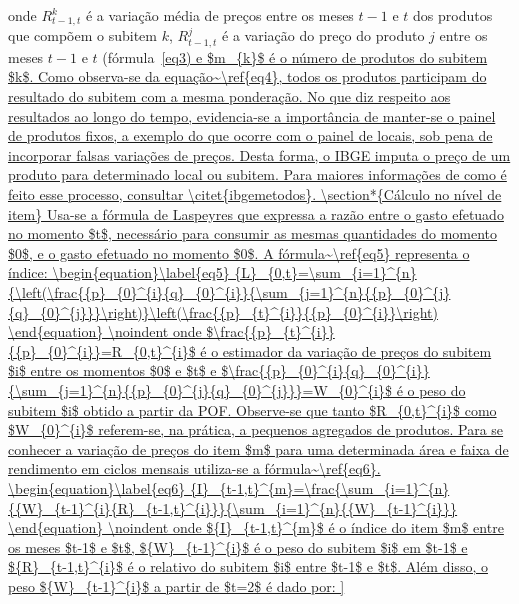 \documentclass[twoside,a4paper,11pt]{report}
\begin{document}
\noindent onde ${R}_{t-1,t}^{k}$ é a variação média de preços entre os meses $t-1$ e $t$ dos produtos que compõem o subitem $k$, ${R}_{t-1,t}^{j}$ é a variação do preço do produto $j$ entre os meses $t-1$ e $t$ (fórmula~\ref{eq3) e $m_{k}$ é o número de produtos do subitem $k$. Como observa-se da equação~\ref{eq4}, todos os produtos participam do resultado do subitem com a mesma ponderação.

No que diz respeito aos resultados ao longo do tempo, evidencia-se a importância de manter-se o painel de produtos fixos, a exemplo do que ocorre com o painel de locais, sob pena de incorporar falsas variações de preços. Desta forma, o IBGE imputa o preço de um produto para determinado local ou subitem. Para maiores informações de como é feito esse processo, consultar \citet{ibgemetodos}.

\section*{Cálculo no nível de item}

Usa-se a fórmula de Laspeyres que expressa a razão entre o gasto efetuado no momento $t$, necessário para consumir as mesmas quantidades do momento $0$, e o gasto efetuado no momento $0$. A fórmula~\ref{eq5} representa o índice:

\begin{equation}\label{eq5}
{L}_{0,t}=\sum_{i=1}^{n}{\left(\frac{{p}_{0}^{i}{q}_{0}^{i}}{\sum_{j=1}^{n}{{p}_{0}^{j}{q}_{0}^{j}}}\right)}\left(\frac{{p}_{t}^{i}}{{p}_{0}^{i}}\right) 
\end{equation}

\noindent onde $\frac{{p}_{t}^{i}}{{p}_{0}^{i}}=R_{0,t}^{i}$ é o estimador da variação de preços do subitem $i$ entre os momentos $0$ e $t$ e $\frac{{p}_{0}^{i}{q}_{0}^{i}}{\sum_{j=1}^{n}{{p}_{0}^{j}{q}_{0}^{j}}}=W_{0}^{i}$ é o peso do subitem $i$ obtido a partir da POF. Observe-se que tanto $R_{0,t}^{i}$ como $W_{0}^{i}$ referem-se, na prática, a pequenos agregados de produtos. Para se conhecer a variação de preços do item $m$ para uma determinada área e faixa de rendimento em ciclos mensais utiliza-se a fórmula~\ref{eq6}.

\begin{equation}\label{eq6}
{I}_{t-1,t}^{m}=\frac{\sum_{i=1}^{n}{{W}_{t-1}^{i}{R}_{t-1,t}^{i}}}{\sum_{i=1}^{n}{{W}_{t-1}^{i}}} 
\end{equation}

\noindent onde ${I}_{t-1,t}^{m}$ é o índice do item $m$ entre os meses $t-1$ e $t$, ${W}_{t-1}^{i}$ é o peso do subitem $i$ em $t-1$ e ${R}_{t-1,t}^{i}$ é o relativo do subitem $i$ entre $t-1$ e $t$. Além disso, o peso ${W}_{t-1}^{i}$ a partir de $t=2$ é dado por:

}
\end{document}
